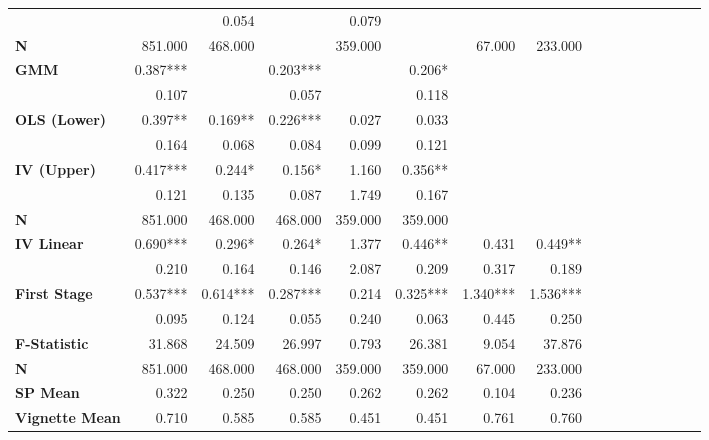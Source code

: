 \begin{tabular}{@{\extracolsep{5pt}}lrrrrrrrrrrrrrrr}
{\bf } & \phantom{***} & 0.054\phantom{***} & \phantom{***} & 0.079\phantom{***} & \phantom{***} & \phantom{***} & \phantom{***} \\
{\bf N} & 851.000\phantom{***} & 468.000\phantom{***} & \phantom{***} & 359.000\phantom{***} & \phantom{***} & 67.000\phantom{***} & 233.000\phantom{***} \\
{\bf GMM} & 0.387*** & \phantom{***} & 0.203*** & \phantom{***} & 0.206*\phantom{**} & \phantom{***} & \phantom{***} \\
{\bf } & 0.107\phantom{***} & \phantom{***} & 0.057\phantom{***} & \phantom{***} & 0.118\phantom{***} & \phantom{***} & \phantom{***} \\
{\bf OLS (Lower)} & 0.397**\phantom{*} & 0.169**\phantom{*} & 0.226*** & 0.027\phantom{***} & 0.033\phantom{***} & \phantom{***} & \phantom{***} \\
{\bf } & 0.164\phantom{***} & 0.068\phantom{***} & 0.084\phantom{***} & 0.099\phantom{***} & 0.121\phantom{***} & \phantom{***} & \phantom{***} \\
{\bf IV (Upper)} & 0.417*** & 0.244*\phantom{**} & 0.156*\phantom{**} & 1.160\phantom{***} & 0.356**\phantom{*} & \phantom{***} & \phantom{***} \\
{\bf } & 0.121\phantom{***} & 0.135\phantom{***} & 0.087\phantom{***} & 1.749\phantom{***} & 0.167\phantom{***} & \phantom{***} & \phantom{***} \\
{\bf N} & 851.000\phantom{***} & 468.000\phantom{***} & 468.000\phantom{***} & 359.000\phantom{***} & 359.000\phantom{***} & \phantom{***} & \phantom{***} \\
{\bf IV Linear} & 0.690*** & 0.296*\phantom{**} & 0.264*\phantom{**} & 1.377\phantom{***} & 0.446**\phantom{*} & 0.431\phantom{***} & 0.449**\phantom{*} \\
{\bf } & 0.210\phantom{***} & 0.164\phantom{***} & 0.146\phantom{***} & 2.087\phantom{***} & 0.209\phantom{***} & 0.317\phantom{***} & 0.189\phantom{***} \\
{\bf First Stage} & 0.537*** & 0.614*** & 0.287*** & 0.214\phantom{***} & 0.325*** & 1.340*** & 1.536*** \\
{\bf } & 0.095\phantom{***} & 0.124\phantom{***} & 0.055\phantom{***} & 0.240\phantom{***} & 0.063\phantom{***} & 0.445\phantom{***} & 0.250\phantom{***} \\
{\bf F-Statistic} & 31.868\phantom{***} & 24.509\phantom{***} & 26.997\phantom{***} & 0.793\phantom{***} & 26.381\phantom{***} & 9.054\phantom{***} & 37.876\phantom{***} \\
{\bf N} & 851.000\phantom{***} & 468.000\phantom{***} & 468.000\phantom{***} & 359.000\phantom{***} & 359.000\phantom{***} & 67.000\phantom{***} & 233.000\phantom{***} \\
{\bf SP Mean} & 0.322\phantom{***} & 0.250\phantom{***} & 0.250\phantom{***} & 0.262\phantom{***} & 0.262\phantom{***} & 0.104\phantom{***} & 0.236\phantom{***} \\
{\bf Vignette Mean} & 0.710\phantom{***} & 0.585\phantom{***} & 0.585\phantom{***} & 0.451\phantom{***} & 0.451\phantom{***} & 0.761\phantom{***} & 0.760\phantom{***} \\
\hline
\end{tabular}
